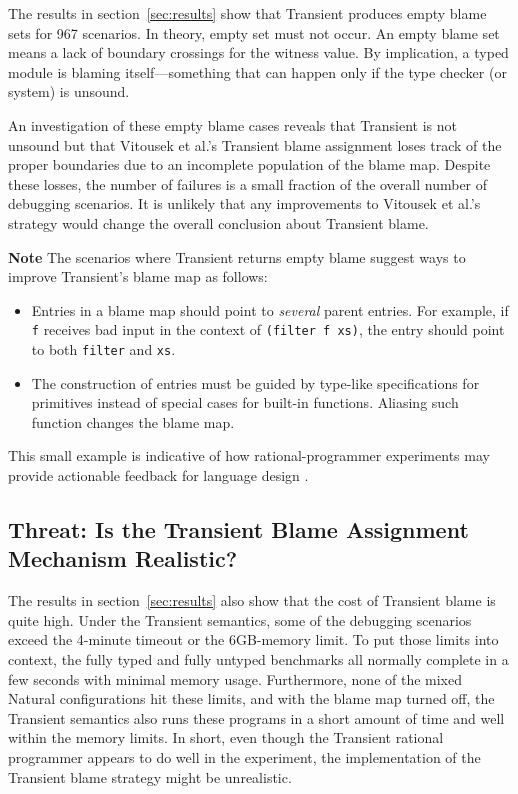 The results in section~\ref{sec:results} show that Transient produces empty
blame sets for 967 scenarios. In theory, empty set must not occur. An
empty blame set means a lack of boundary crossings for the witness value.
By implication, a typed module is blaming itself---something that can
happen only if the type checker (or system) is unsound.

An investigation of these empty blame cases reveals that Transient is not
unsound but that Vitousek et al.'s Transient blame assignment loses track
of the proper boundaries due to an incomplete population of the blame map.
Despite these losses, the number of failures is a small fraction of the
overall number of debugging scenarios. It is unlikely that any
improvements to Vitousek et al.'s strategy would change the overall
conclusion about Transient blame.

{\bf Note} The scenarios where Transient returns empty blame 
suggest ways to improve Transient's blame map as follows:
\begin{itemize}

\item Entries in a blame map should point to {\em several\/} parent entries.
 For example, if \texttt{f} receives bad input in the context of {\tt (filter f
 xs)}, the entry should point to both \texttt{filter} and \texttt{xs}.

\item The construction of entries must be guided by type-like specifications for
 primitives instead of special cases for built-in functions. Aliasing such
 function changes the blame map.

\end{itemize}
This small example is indicative of how rational-programmer experiments may
provide actionable feedback for language design . 


\subsection{Threat: Is the Transient Blame Assignment Mechanism Realistic?}
\label{sec:threat:transient2}

The results in section~\ref{sec:results} also show that the cost of Transient
blame is quite high. Under the Transient semantics, some of the debugging
scenarios exceed the 4-minute timeout or the 6GB-memory limit. To put those
limits into context, the fully typed and fully untyped benchmarks all normally complete
in a few seconds with minimal memory usage. Furthermore, none of the mixed
Natural configurations hit these limits, and with the blame map turned off,
the Transient semantics also runs these programs in a short amount of time and
well within the memory limits. In short, even though the Transient rational
programmer appears to do well in the experiment, the implementation of the
Transient blame strategy might be unrealistic. 

